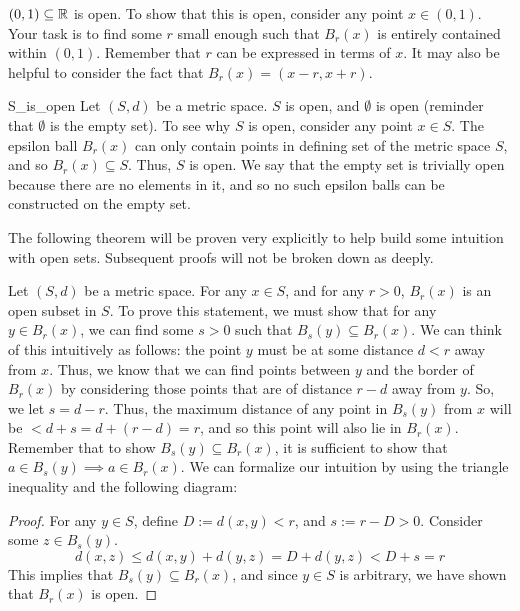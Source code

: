 \begin{exmp}{}{}
\((0, 1) \subseteq {\mathbb R}\) is open. To show that this is open, consider any point \(x\in (0, 1)\). Your task is to find some \(r\) small enough such that \(B_r(x)\) is entirely contained within \((0, 1)\). Remember that \(r\) can be expressed in terms of \(x\). It may also be helpful to consider the fact that \(B_r(x)= (x - r, x + r)\).
\end{exmp}
\begin{exmp}{}{S_is_open}
Let \((S, d)\) be a metric space. \(S\) is open, and \(\emptyset\) is open (reminder that \(\emptyset\) is the empty set). To see why \(S\) is open, consider any point \(x \in S\). The epsilon ball \(B_r(x)\) can only contain points in defining set of the metric space \(S\), and so \(B_r(x) \subseteq S\). Thus, \(S\) is open. We say that the empty set is trivially open because there are no elements in it, and so no such epsilon balls can be constructed on the empty set.
\end{exmp}
The following theorem will be proven very explicitly to help build some intuition with open sets. Subsequent proofs will not be broken down as deeply.
\newline
\begin{thm}{}{}
Let \((S, d)\) be a metric space. For any \(x \in S\), and for any \(r > 0\), \(B_r(x)\) is an open subset in \(S\).
\newline
\newline 
To prove this statement, we must show that for any \(y \in B_r(x)\), we can find some \(s > 0\) such that \(B_s(y) \subseteq B_r(x)\). We can think of this intuitively as follows: the point \(y\) must be at some distance \(d < r\) away from \(x\). Thus, we know that we can find points between \(y\) and the border of \(B_r(x)\) by considering those points that are of distance \(r - d\) away from \(y\). So, we let \(s = d - r\). Thus, the maximum distance of any point in \(B_s(y)\) from \(x\) will be \(< d + s = d + (r - d) = r\), and so this point will also lie in \(B_r(x)\). Remember that to show \(B_s(y) \subseteq B_r(x)\), it is sufficient to show that \(a \in B_s(y) \implies a \in B_r(x)\). We can formalize our intuition by using the triangle inequality and the following diagram:
\begin{proof}
	For any \(y \in S\), define \(D := d(x, y) < r\), and \(s := r - D > 0\). Consider some \(z \in B_s(y)\).
	\begin{equation*}
  		d(x,z) \leq d(x,y) + d(y,z) = D + d(y,z) < D + s = r
	\end{equation*}
	This implies that \(B_s(y) \subseteq B_r(x)\), and since \(y \in S\) is arbitrary, we have shown that \(B_r(x)\) is open.

\end{proof}
\end{thm}

